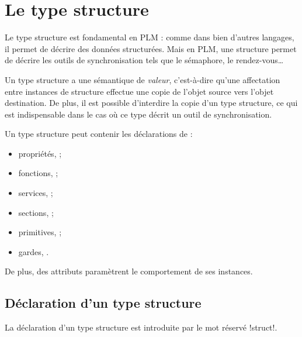 




\chapter{Le type structure}


Le type structure est fondamental en PLM : comme dans bien d'autres langages, il permet de décrire des données structurées. Mais en PLM, une structure permet de décrire les outils de synchronisation tels que le sémaphore, le rendez-vous…

Un type structure a une sémantique de \emph{valeur}, c'est-à-dire qu'une affectation entre instances de structure effectue une copie de l'objet source vers l'objet destination. De plus, il est possible d'interdire la copie d'un type structure, ce qui est indispensable dans le cas où ce type décrit un outil de synchronisation.

Un type structure peut contenir les déclarations de :
\begin{itemize}
\item propriétés,  ;
\item fonctions,  ;
\item services,  ;
\item sections,  ;
\item primitives,  ;
\item gardes, .
\end{itemize}

De plus, des attributs paramètrent le comportement de ses instances.











\section{Déclaration d'un type structure}

La déclaration d'un type structure est introduite par le mot réservé \plm!struct!.


